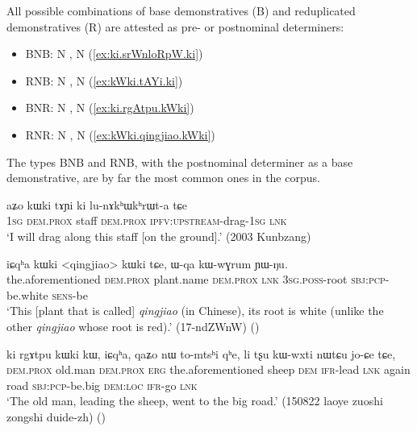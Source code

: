 All possible combinations of base demonstratives (B) and reduplicated demonstratives (R) are attested as pre- or postnominal determiners:

\begin{itemize}
\item BNB:  N ,  N  (\ref{ex:ki.srWnloRpW.ki})
\item RNB:  N ,  N  (\ref{ex:kWki.tAYi.ki})
\item BNR:  N ,  N  (\ref{ex:ki.rgAtpu.kWki})
\item RNR:  N ,  N  (\ref{ex:kWki.qingjiao.kWki})
\end{itemize}  

The types BNB and RNB, with the postnominal determiner as a base demonstrative, are by far the most common ones in the corpus.

\begin{exe}
\ex \label{ex:kWki.tAYi.ki}
 \gll  aʑo kɯki tɤɲi ki lu-nɤkʰɯkʰrɯt-a tɕe \\
 \textsc{1sg} \textsc{dem}.\textsc{prox} staff \textsc{dem}.\textsc{prox} \textsc{ipfv}:\textsc{upstream}-drag-\textsc{1sg} \textsc{lnk} \\
 \glt `I will drag along this staff [on the ground].' (2003 Kunbzang)
\end{exe}
 

\begin{exe}
\ex \label{ex:kWki.qingjiao.kWki}
 \gll iɕqʰa kɯki <qingjiao> kɯki tɕe, ɯ-qa kɯ-wɣrum ɲɯ-ŋu. \\
 the.aforementioned \textsc{dem}.\textsc{prox} plant.name \textsc{dem}.\textsc{prox} \textsc{lnk} \textsc{3sg}.\textsc{poss}-root \textsc{sbj}:\textsc{pcp}-be.white \textsc{sens}-be \\
 \glt `This [plant that is called]  \textit{qingjiao} (in Chinese), its root is white (unlike the other \textit{qingjiao} whose root is red).' (17-ndZWnW) ()
\end{exe}

\begin{exe}
\ex \label{ex:ki.rgAtpu.kWki}
 \gll ki rgɤtpu kɯki kɯ, iɕqʰa, qaʑo nɯ to-mtsʰi qʰe, li tʂu kɯ-wxti nɯtɕu jo-ɕe tɕe, \\
\textsc{dem}.\textsc{prox} old.man \textsc{dem}.\textsc{prox} \textsc{erg} the.aforementioned sheep \textsc{dem} \textsc{ifr}-lead \textsc{lnk} again road \textsc{sbj}:\textsc{pcp}-be.big \textsc{dem}:\textsc{loc} \textsc{ifr}-go \textsc{lnk} \\
\glt `The old man, leading the sheep, went to the big road.' (150822 laoye zuoshi zongshi duide-zh)
()
\end{exe}

